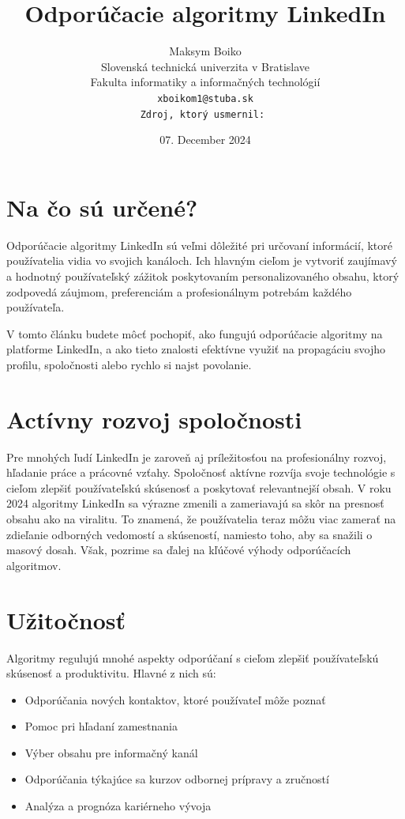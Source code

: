 \documentclass[slovak,a4paper]{coursepaper}
\title{Odporúčacie algoritmy LinkedIn\centering}
\author{Maksym Boiko\\[2pt]
{ Slovenská technická univerzita v Bratislave}\\
{ Fakulta informatiky a informačných technológií}\\
{\texttt{xboikom1@stuba.sk}}\\
{\texttt{Zdroj, ktorý usmernil:~\cite{1}}}
}
\date{\small 07. December 2024}
\begin{document}
\maketitle

\section{Na čo sú určené?}
Odporúčacie algoritmy LinkedIn sú veľmi dôležité pri určovaní informácií, ktoré používatelia vidia vo svojich kanáloch. Ich hlavným cieľom je vytvoriť zaujímavý a hodnotný používateľský zážitok poskytovaním personalizovaného obsahu, ktorý zodpovedá záujmom, preferenciám a profesionálnym potrebám každého používateľa.

V tomto článku budete môcť pochopiť, ako fungujú odporúčacie algoritmy na platforme LinkedIn, a ako tieto znalosti efektívne využiť na propagáciu svojho profilu, spoločnosti alebo rychlo si najst povolanie.~\cite{2}

\section{Actívny rozvoj spoločnosti} \label{rozvoj spoločnosti}

Pre mnohých ľudí LinkedIn je zaroveň aj príležitosťou na profesionálny rozvoj, hľadanie práce a prácovné vzťahy.
Spoločnosť aktívne rozvíja svoje technológie s cieľom zlepšiť používateľskú skúsenosť a poskytovať relevantnejší obsah. V roku 2024 algoritmy LinkedIn sa výrazne zmenili a zameriavajú sa skôr na presnosť obsahu ako na viralitu. To znamená, že používatelia teraz môžu viac zamerať na zdieľanie odborných vedomostí a skúseností, namiesto toho, aby sa snažili o masový dosah. Však, pozrime sa ďalej na kľúčové výhody odporúčacích algoritmov.

\section{Užitočnosť} \label{Užitočnosť}
Algoritmy regulujú mnohé aspekty odporúčaní s cieľom zlepšiť používateľskú skúsenosť a produktivitu. Hlavné z nich sú:

\begin{itemize}
	\item Odporúčania nových kontaktov, ktoré používateľ môže poznať
	\item Pomoc pri hľadaní zamestnania
	\item Výber obsahu pre informačný kanál
	\item Odporúčania týkajúce sa kurzov odbornej prípravy a zručností
	\item Analýza a prognóza kariérneho vývoja
  \end{itemize}
\end{document}
